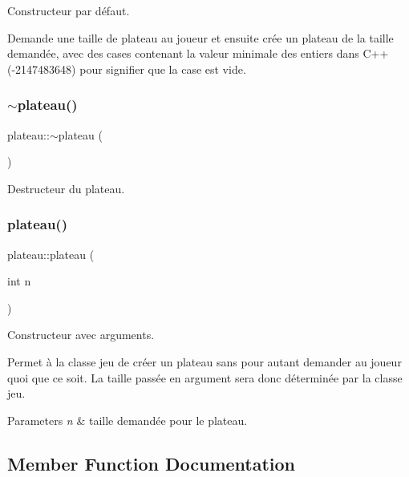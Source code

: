 Constructeur par défaut. 

Demande une taille de plateau au joueur et ensuite crée un plateau de la taille demandée, avec des cases contenant la valeur minimale des entiers dans C++ (-\/2147483648) pour signifier que la case est vide. \mbox{\label{classplateau_a336a9f14762c3821cf717cca91f6ca86}} 
\subsubsection{\texorpdfstring{$\sim$plateau()}{~plateau()}}
{\footnotesize\ttfamily plateau\+::$\sim$plateau (\begin{DoxyParamCaption}{ }\end{DoxyParamCaption})}



Destructeur du plateau. 

\mbox{\label{classplateau_a4e5cc7f71d0a559f595e48e2533a6a00}} 
\subsubsection{\texorpdfstring{plateau()}{plateau()}\hspace{0.1cm}{\footnotesize\ttfamily [2/2]}}
{\footnotesize\ttfamily plateau\+::plateau (\begin{DoxyParamCaption}\item[{int}]{n }\end{DoxyParamCaption})}



Constructeur avec arguments. 

Permet à la classe jeu de créer un plateau sans pour autant demander au joueur quoi que ce soit. La taille passée en argument sera donc déterminée par la classe jeu. 
\begin{DoxyParams}{Parameters}
{\em n} & taille demandée pour le plateau. \\
\hline
\end{DoxyParams}


\subsection{Member Function Documentation}
\mbox{\label{classplateau_a9c40ed64826dc83cd9449d023121d9d7}} 
